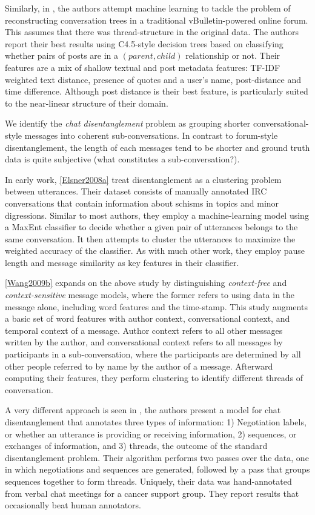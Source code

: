 \documentclass[10pt]{article}
\begin{document}
Similarly, in \cite{Aumayr2011a}, the authors attempt machine learning to 
tackle the problem of reconstructing conversation trees in a traditional
vBulletin-powered online forum. This assumes that there was thread-structure 
in the original data. The authors report their best results using C4.5-style
decision trees based on classifying whether pairs of posts are in a $(parent, child)$
relationship or not. Their features are a mix of shallow textual and post 
metadata features: TF-IDF weighted text distance, 
presence of quotes and a user's name, post-distance and time difference. 
Although post distance is their best feature, is particularly suited to the 
near-linear structure of their domain.

We identify the \textit{chat disentanglement} problem as grouping
shorter conversational-style messages into coherent sub-conversations.
In contrast to forum-style disentanglement, the length of each messages tend to be shorter
and ground truth data is quite subjective (what constitutes a sub-conversation?).

In early work, \ref{Elsner2008a} treat disentanglement as a clustering problem between 
utterances. Their dataset consists of manually annotated IRC conversations that contain
information about schisms in topics and minor digressions. Similar to most authors, 
they employ a machine-learning model using a MaxEnt classifier to decide whether a given pair of
utterances belongs to the same conversation. It then attempts to cluster the
utterances to maximize the weighted accuracy of the classifier. As with much other
work, they employ pause length and message similarity as key features in
their classifier.

\ref{Wang2009b} expands on the above study by distinguishing
\textit{context-free} and \textit{context-sensitive} message models, where the 
former refers to using data in the message alone, including word features and the
time-stamp.  This study augments a basic set of word features with author context, 
conversational context, and temporal context of a message. Author context 
refers to all other messages written by the author, and conversational context 
refers to all messages by participants in a sub-conversation, 
where the participants are determined by all other people referred to by name 
by the author of a message.  Afterward computing their features, they perform
clustering to identify different threads of conversation.

A very different approach is seen in \cite{Mayfield2012a}, the authors present
a model for chat disentanglement that annotates three types of information: 1) 
Negotiation labels, or whether an utterance is providing or receiving 
information, 2) sequences, or exchanges of information, and 3) threads, the 
outcome of the standard disentanglement problem. Their algorithm performs 
two passes over the data,  one in which negotiations and sequences are generated, 
followed by a pass that groups sequences together to form threads. Uniquely,
their data was hand-annotated from verbal chat meetings for a cancer support group.
They report results that occasionally beat human annotators.
\end{document}
